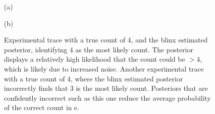 \begin{figure}[t]
  \begin{panel}{(a)}{\textwidth}
    \setlength{}%
    \setlength\plotheight{36mm}%
    \small
    \centerline{}
  \end{panel}
  \begin{panel}{(b)}{\textwidth}
    \setlength{}%
    \setlength\plotheight{36mm}%
    \small
    \centerline{}
  \end{panel}
  \caption{%
     Experimental trace with a true count of 4, and the blinx 
    estimated posterior, identifying 4 as the most likely count. The posterior 
    displays a relatively high likelihood that the count could be $>4$, which is likely 
    due to increased noise.
     Another experimental trace with a true count of 4, where the blinx 
    estimated posterior incorrectly finds that 3 is the most likely count. Posteriors 
    that are confidently incorrect such as this one reduce the average probability of 
    the correct count in e.
  }
  \label{fig:exp_posterior}
\end{figure}
